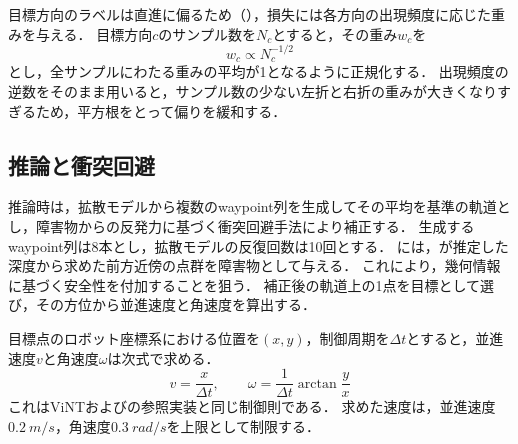 目標方向のラベルは直進に偏るため（），損失には各方向の出現頻度に応じた重みを与える．
目標方向$c$のサンプル数を$N_c$とすると，その重み$w_c$を
\begin{equation}
  w_c \propto N_c^{-1/2}
  \label{eq:loss_weight}
\end{equation}
とし，全サンプルにわたる重みの平均が1となるように正規化する．
出現頻度の逆数をそのまま用いると，サンプル数の少ない左折と右折の重みが大きくなりすぎるため，平方根をとって偏りを緩和する．

\subsection{推論と衝突回避}

推論時は，拡散モデルから複数のwaypoint列を生成してその平均を基準の軌道とし，障害物からの反発力に基づく衝突回避手法\CARE\cite{care}により補正する．
生成するwaypoint列は8本とし，拡散モデルの反復回数は10回とする．
\CARE には，\UniDepth が推定した深度から求めた前方近傍の点群を障害物として与える．
これにより，幾何情報に基づく安全性を付加することを狙う．
補正後の軌道上の1点を目標として選び，その方位から並進速度と角速度を算出する．

目標点のロボット座標系における位置を$(x, y)$，制御周期を$\Delta t$とすると，並進速度$v$と角速度$\omega$は次式で求める．
\begin{equation}
  v = \frac{x}{\Delta t}, \qquad
  \omega = \frac{1}{\Delta t}\arctan\frac{y}{x}
  \label{eq:control}
\end{equation}
これはViNTおよび\NoMaD の参照実装と同じ制御則である．
求めた速度は，並進速度$\SI{0.2}{m/s}$，角速度$\SI{0.3}{rad/s}$を上限として制限する．
